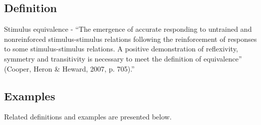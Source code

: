 \subsection{Definition}
Stimulus equivalence - ``The emergence of accurate responding to untrained and nonreinforced stimulus-stimulus relations following the reinforcement of responses to some stimulus-stimulus relations. A positive demonstration of reflexivity, symmetry and transitivity is necessary to meet the definition of equivalence'' (Cooper, Heron \& Heward, 2007, p. 705).'' 

\subsection{Examples}
Related definitions and examples are presented below.
